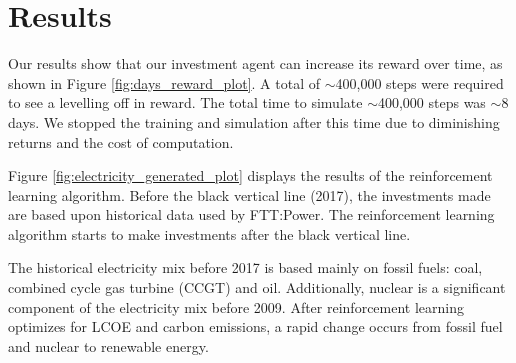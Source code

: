 \documentclass{article}
\begin{document}

%



\section{Results}
\label{sec:results}


%

Our results show that our investment agent can increase its reward over time, as shown in Figure \ref{fig:days_reward_plot}. A total of ${\sim}$400,000 steps were required to see a levelling off in reward. The total time to simulate ${\sim}$400,000 steps was ${\sim}$8 days. We stopped the training and simulation after this time due to diminishing returns and the cost of computation.

Figure \ref{fig:electricity_generated_plot} displays the results of the reinforcement learning algorithm. Before the black vertical line (2017), the investments made are based upon historical data used by FTT:Power. The reinforcement learning algorithm starts to make investments after the black vertical line. 


The historical electricity mix before 2017 is based mainly on fossil fuels: coal, combined cycle gas turbine (CCGT) and oil. Additionally, nuclear is a significant component of the electricity mix before 2009. After reinforcement learning optimizes for LCOE and carbon emissions, a rapid change occurs from fossil fuel and nuclear to renewable energy. 
\end{document}
